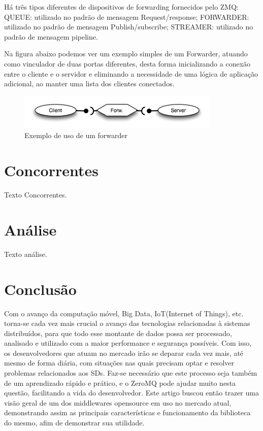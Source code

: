 \documentclass[12pt]{article}
\begin{document}
	Há três tipos diferentes de dispositivos de forwarding fornecidos pelo ZMQ:
	QUEUE: utilizado no padrão de mensagem Request/response;
	FORWARDER: utilizado no padrão de mensagem Publish/subscribe;
	STREAMER: utilizado no padrão de mensagem pipeline.

	Na figura abaixo podemos ver um exemplo simples de um Forwarder, atuando como vinculador de duas portas diferentes, desta forma inicializando a conexão entre o cliente e o servidor e eliminando a necessidade de uma lógica de aplicação adicional, ao manter uma lista dos clientes conectados.

\begin{figure}[ht]
\centering
\includegraphics[width=.5\textwidth]{cfs.png}
\caption{Exemplo de uso de um forwarder}
\label{fig:exampleFig3}
\end{figure}

\section{Concorrentes}
	Texto Concorrentes.

\section{Análise}
	Texto análise.

\section{Conclusão}

	Com o avanço da computação móvel, Big Data, IoT(Internet of Things), etc. torna-se cada vez mais crucial o avanço das tecnologias relacionadas à sistemas distribuídos, para que todo esse montante de dados possa ser processado, analisado e utilizado com a maior performance e segurança possíveis. Com isso, os desenvolvedores que atuam no mercado irão se deparar cada vez mais, até mesmo de forma diária, com situações nas quais precisam optar e resolver problemas relacionados aos SDs. Faz-se necessário que este processo seja também de um aprendizado rápido e prático, e o ZeroMQ pode ajudar muito nesta questão, facilitando a vida do desenvolvedor. Este artigo buscou então trazer uma visão geral de um dos middlewares opensource em uso no mercado atual, demonstrando assim as principais características e funcionamento da biblioteca do mesmo, afim de demonstrar sua utilidade.
\end{document}
